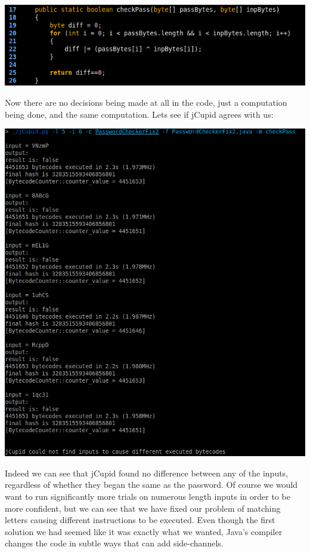 \begin{center}
  \includegraphics[width=\linewidth]{PasswordCheckerFix2}
\end{center}

Now there are no decisions being made at all in the code, just a computation being done, and the same 
computation. Lets see if jCupid agrees with us:

\begin{center}
  \includegraphics[width=\linewidth]{jCupidRun3}
\end{center}

Indeed we can see that jCupid found no difference between any of the inputs, regardless of whether they 
began the same as the password. Of course we would want to run significantly more trials on numerous 
length inputs in order to be more confident, but we can see that we have fixed our problem of matching
letters causing different instructions to be executed. Even though the first solution we had seemed like
it was exactly what we wanted, Java's compiler changes the code in subtle ways that can add side-channels.

